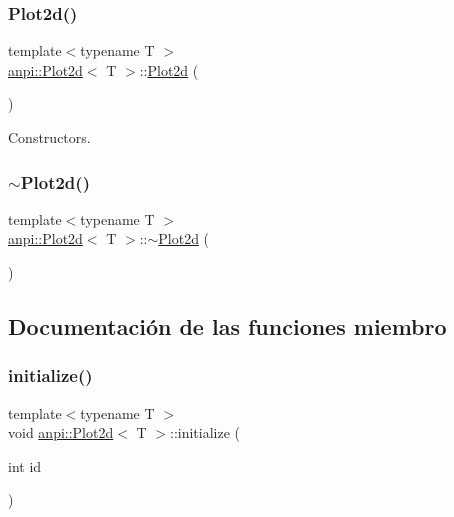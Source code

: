 \subsubsection{\texorpdfstring{Plot2d()}{Plot2d()}}
{\footnotesize\ttfamily template$<$typename T $>$ \\
\hyperlink{classanpi_1_1Plot2d}{anpi\+::\+Plot2d}$<$ T $>$\+::\hyperlink{classanpi_1_1Plot2d}{Plot2d} (\begin{DoxyParamCaption}{ }\end{DoxyParamCaption})}



Constructors. 

\mbox{\label{classanpi_1_1Plot2d_a0a9ba35b064aef73a9c6f601b2345734}} 
\subsubsection{\texorpdfstring{$\sim$\+Plot2d()}{~Plot2d()}}
{\footnotesize\ttfamily template$<$typename T $>$ \\
\hyperlink{classanpi_1_1Plot2d}{anpi\+::\+Plot2d}$<$ T $>$\+::$\sim$\hyperlink{classanpi_1_1Plot2d}{Plot2d} (\begin{DoxyParamCaption}{ }\end{DoxyParamCaption})}



\subsection{Documentación de las funciones miembro}
\mbox{\label{classanpi_1_1Plot2d_ac6fb0ae9c26f3779b408f239026455ba}} 
\subsubsection{\texorpdfstring{initialize()}{initialize()}}
{\footnotesize\ttfamily template$<$typename T $>$ \\
void \hyperlink{classanpi_1_1Plot2d}{anpi\+::\+Plot2d}$<$ T $>$\+::initialize (\begin{DoxyParamCaption}\item[{int}]{id }\end{DoxyParamCaption})}

